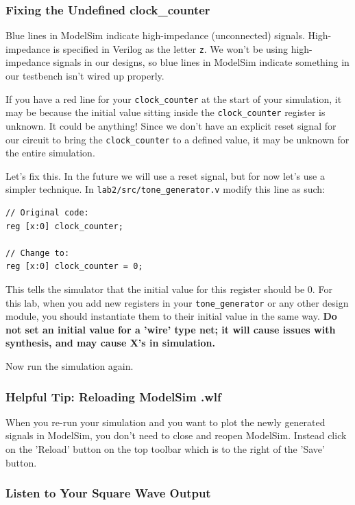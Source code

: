 \documentclass[11pt]{article}
\begin{document}
\subsubsection{Fixing the Undefined clock\_counter}

Blue lines in ModelSim indicate high-impedance (unconnected) signals. High-impedance is specified in Verilog as the letter \verb|z|. We won't be using high-impedance signals in our designs, so blue lines in ModelSim indicate something in our testbench isn't wired up properly.

If you have a red line for your \verb|clock_counter| at the start of your simulation, it may be because the initial value sitting inside the \verb|clock_counter| register is unknown. It could be anything! Since we don't have an explicit reset signal for our circuit to bring the \verb|clock_counter| to a defined value, it may be unknown for the entire simulation.

Let's fix this. In the future we will use a reset signal, but for now let's use a simpler technique. In \verb|lab2/src/tone_generator.v| modify this line as such:

\begin{verbatim}
// Original code:
reg [x:0] clock_counter;

// Change to:
reg [x:0] clock_counter = 0;
\end{verbatim}

This tells the simulator that the initial value for this register should be 0. For this lab, when you add new registers in your \verb|tone_generator| or any other design module, you should instantiate them to their initial value in the same way. \textbf{Do not set an initial value for a 'wire' type net; it will cause issues with synthesis, and may cause X's in simulation.}

Now run the simulation again.

\subsubsection{Helpful Tip: Reloading ModelSim .wlf}

When you re-run your simulation and you want to plot the newly generated signals in ModelSim, you don't need to close and reopen ModelSim. Instead click on the 'Reload' button on the top toolbar which is to the right of the 'Save' button.

\subsubsection{Listen to Your Square Wave Output}
\end{document}
